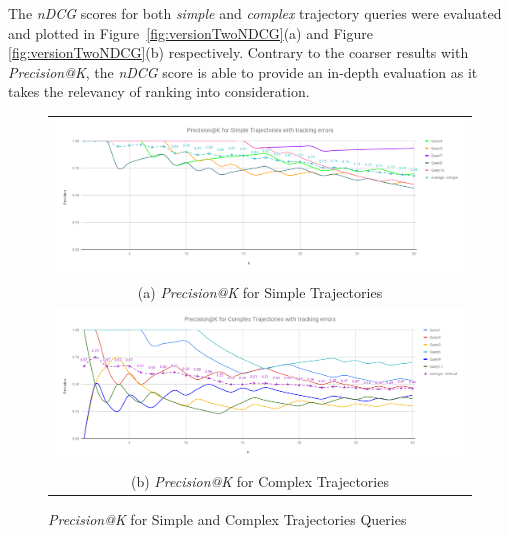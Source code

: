 The \textit{nDCG} scores for both \textit{simple} and \textit{complex} trajectory queries were evaluated and plotted in Figure~\ref{fig:versionTwoNDCG}(a) and Figure \ref{fig:versionTwoNDCG}(b) respectively. Contrary to the coarser results with \textit{Precision@K}, the \textit{nDCG} score is able to provide an in-depth evaluation as it takes the relevancy of ranking into consideration.
\begin{figure}[tb!]
  \centering
\begin{tabular}{c}
 \includegraphics[width=0.9\linewidth]{image/retrievalTwo/p@k_simple.png}\\
 (a) \textit{Precision@K} for Simple Trajectories \\
 \includegraphics[width=0.9\linewidth]{image/retrievalTwo/p@k_complex.png} \\
 (b) \textit{Precision@K} for Complex Trajectories
\end{tabular}
\caption{\textit{Precision@K} for Simple and Complex Trajectories Queries}
\label{fig:versionTwoPatKAll}
\end{figure}
